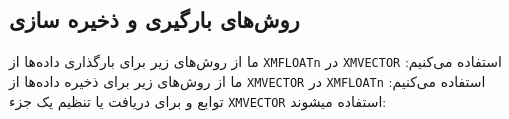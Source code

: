 \subsection{\textbf{روش‌های بارگیری و ذخیره سازی}}
\label{subsec:1.6.2}
{
    \Large
    \begin{spacing}{1.5}
        ما از روش‌های زیر برای بارگذاری داده‌ها از \texttt{XMFLOATn} در \texttt{XMVECTOR} استفاده می‌کنیم:
        \textbf{\vspace{4pt}}
        \lr{}
        \textbf{\vspace{3pt}}
        ما از روش‌های زیر برای ذخیره داده‌ها از \texttt{XMVECTOR} در \texttt{XMFLOATn} استفاده می‌کنیم:
        \textbf{\vspace{4pt}}
        \lr{}
        \textbf{\vspace{3pt}}
        توابع  و  برای دریافت یا تنظیم یک جزء \texttt{XMVECTOR} استفاده میشوند:
        \textbf{\vspace{4pt}}
        \lr{}
    \end{spacing}
}

\textbf{\vspace{-65pt}}


